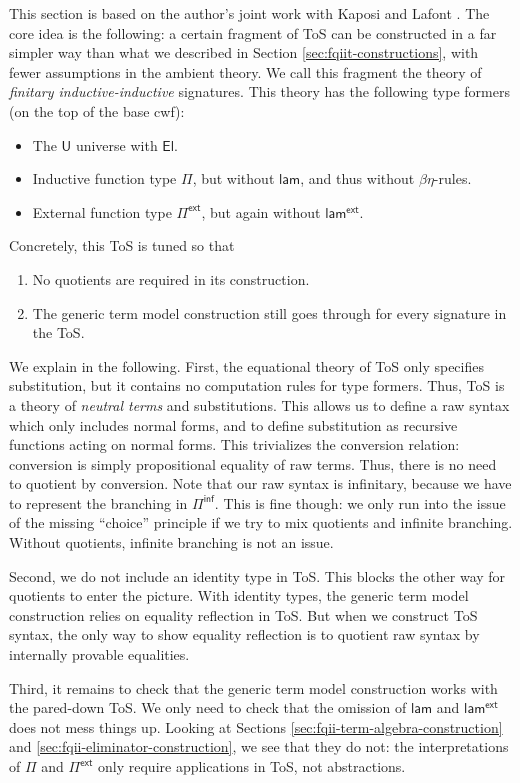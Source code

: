 \documentclass[12pt,a4paper,twoside,openany]{book}
\theoremstyle{remark}
\theoremstyle{definition}
\theoremstyle{theorem}
\newcommand{\ms}[1]{\mathsf{#1}}
\newcommand{\U}{\mathsf{U}}
\newcommand{\El}{\mathsf{El}}
\newcommand{\lami}{\mathsf{lam}}
\newcommand{\Pie}{\Pi^{\mathsf{ext}}}
\newcommand{\lame}{\mathsf{lam^{ext}}}
\newcommand{\Piinf}{\Pi^{\mathsf{inf}}}
\newcommand{\lam}{\ms{lam}}
\begin{document}
This section is based on the author's joint work with Kaposi and Lafont
\cite{ind-ind-reduction}. The core idea is the following: a certain fragment of
ToS can be constructed in a far simpler way than what we described in Section
\ref{sec:fqiit-constructions}, with fewer assumptions in the ambient theory.  We
call this fragment the theory of \emph{finitary inductive-inductive} signatures.
This theory has the following type formers (on the top of the base cwf):
\begin{itemize}
  \item The $\U$ universe with $\El$.
  \item Inductive function type $\Pi$, but without $\lami$, and thus without $\beta\eta$-rules.
  \item External function type $\Pie$, but again without $\lame$.
\end{itemize}
Concretely, this ToS is tuned so that
\begin{enumerate}
  \item No quotients are required in its construction.
  \item The generic term model construction still goes through for every signature in
        the ToS.
\end{enumerate}
We explain in the following. First, the equational theory of ToS only specifies
substitution, but it contains no computation rules for type formers. Thus, ToS
is a theory of \emph{neutral terms} and substitutions. This allows us to define
a raw syntax which only includes normal forms, and to define substitution as
recursive functions acting on normal forms. This trivializes the conversion
relation: conversion is simply propositional equality of raw terms. Thus, there
is no need to quotient by conversion. Note that our raw syntax is infinitary,
because we have to represent the branching in $\Piinf$. This is fine though: we
only run into the issue of the missing ``choice'' principle if we try to mix
quotients and infinite branching. Without quotients, infinite branching is not
an issue.

Second, we do not include an identity type in ToS. This blocks the other way for
quotients to enter the picture. With identity types, the generic term model
construction relies on equality reflection in ToS. But when we construct ToS
syntax, the only way to show equality reflection is to quotient raw syntax by
internally provable equalities.

Third, it remains to check that the generic term model construction works with
the pared-down ToS. We only need to check that the omission of $\lam$ and
$\lame$ does not mess things up. Looking at Sections
\ref{sec:fqii-term-algebra-construction} and
\ref{sec:fqii-eliminator-construction}, we see that they do not: the
interpretations of $\Pi$ and $\Pie$ only require applications in ToS, not
abstractions.
\end{document}
